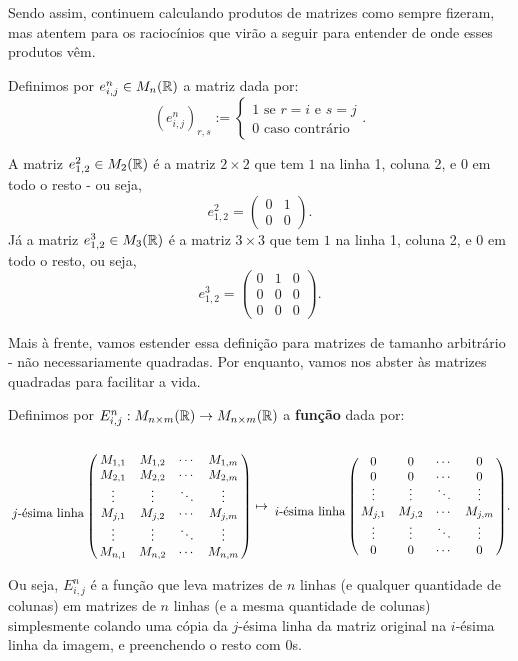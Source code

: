 Sendo assim, continuem calculando produtos de matrizes como sempre fizeram, mas atentem para os raciocínios que virão a seguir para entender de onde esses produtos vêm.

\bigskip
\begin{df}
	Definimos por $e_{i,j}^n\in M_n(\mathbb R)$ a matriz dada por:
	\[(e_{i,j}^n)_{r,s}:=\begin{cases}
	1\text{ se } r=i \text{ e } s=j\\
	0\text{ caso contrário }
	\end{cases}.\]
\end{df}

\begin{ex}
	A matriz $e^2_{1,2}\in M_{2}(\mathbb R)$ é a matriz $2\times 2$ que tem $1$ na linha 1, coluna 2, e $0$ em todo o resto - ou seja,\[e^2_{1,2}=\begin{pmatrix}
	0 & 1\\
	0 & 0
	\end{pmatrix}.\] Já a matriz $e^3_{1,2}\in M_3(\mathbb R)$ é a matriz $3\times 3$ que tem $1$ na linha 1, coluna 2, e $0$ em todo o resto, ou seja, \[e^3_{1,2}=\begin{pmatrix}
	0 & 1&0\\
	0 & 0&0\\
	0&0&0
	\end{pmatrix}.\]
\end{ex}

Mais à frente, vamos estender essa definição para matrizes de tamanho arbitrário - não necessariamente quadradas. Por enquanto, vamos nos abster às matrizes quadradas para facilitar a vida.

\begin{df}
	Definimos por $E^n_{i,j}:M_{n\times m}(\mathbb R)\to M_{n\times m}(\mathbb R)$ a \textbf{função} dada por:
	\[\bordermatrix{&&&&\cr
		&M_{1,1} & M_{1,2} & \cdots & M_{1,m}\cr
		& M_{2,1}& M_{2,2} & \cdots & M_{2,m}\cr
		& \vdots & \vdots & \ddots & \vdots\cr		
		j\text{-ésima linha}& M_{j,1} & M_{j,2} & \cdots & M_{j,m}\cr
		& \vdots & \vdots & \ddots & \vdots\cr
		&M_{n,1} & M_{n,2} & \cdots & M_{n,m}	
	}\mapsto
	\bordermatrix{
	&&&&\cr
	&0&0&\cdots&0\cr
	&0&0&\cdots&0\cr
	& \vdots & \vdots & \ddots & \vdots\cr
	i\text{-ésima linha}& M_{j,1} & M_{j,2} & \cdots & M_{j,m}\cr
	& \vdots & \vdots & \ddots & \vdots\cr
	&0&0&\cdots&0
	}.
	\]
\end{df}

Ou seja, $E^n_{i,j}$ é a função que leva matrizes de $n$ linhas (e qualquer quantidade de colunas) em matrizes de $n$ linhas (e a mesma quantidade de colunas) simplesmente colando uma cópia da $j$-ésima linha da matriz original na $i$-ésima linha da imagem, e preenchendo o resto com $0$s.

